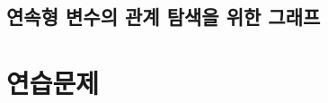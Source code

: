 \documentclass[
]{book}
\begin{document}
\hypertarget{uxc5f0uxc18duxd615-uxbcc0uxc218uxc758-uxad00uxacc4-uxd0d0uxc0c9uxc744-uxc704uxd55c-uxadf8uxb798uxd504}{%
\subsection{연속형 변수의 관계 탐색을 위한 그래프}\label{uxc5f0uxc18duxd615-uxbcc0uxc218uxc758-uxad00uxacc4-uxd0d0uxc0c9uxc744-uxc704uxd55c-uxadf8uxb798uxd504}}

\hypertarget{uxc5f0uxc2b5uxbb38uxc81c-5}{%
\section{연습문제}\label{uxc5f0uxc2b5uxbb38uxc81c-5}}

  
\end{document}
